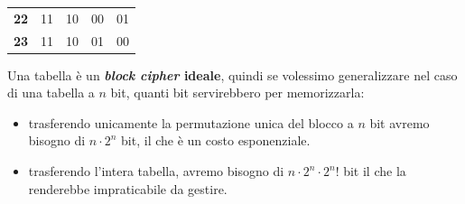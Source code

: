 \begin{boxA}
\begin{center}
\begin{tabular}{c|cccc}
            \textbf{22} & 11 & 10 & 00 & 01 \\
            \textbf{23} & 11 & 10 & 01 & 00 \\
        \end{tabular}
    \end{center}
    Una tabella è un \textbf{\textit{block cipher} ideale}, quindi se volessimo generalizzare nel caso di una tabella a $n$ bit, quanti bit servirebbero per memorizzarla:
    \begin{itemize}[nosep]
        \item trasferendo unicamente la permutazione unica del blocco a $n$ bit avremo bisogno di $n \cdot 2^n$ bit, il che è un costo esponenziale.
        \item trasferendo l'intera tabella, avremo bisogno di $n \cdot 2^n \cdot 2^n !$ bit il che la renderebbe impraticabile da gestire.
    \end{itemize}
\end{boxA}

